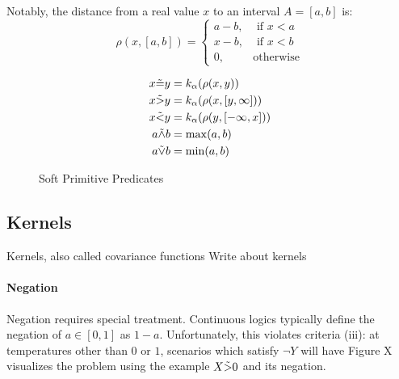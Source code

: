 Notably, the distance from a real value $x$ to an interval $A = [a, b]$ is:
\begin{equation}
\rho(x, [a, b]) =
\begin{cases}
  a - b, & \text{ if } x < a\\
  x - b, & \text{ if } x < b\\
  0,              & \text{otherwise}
\end{cases}
\end{equation}



\begin{figure}
  \begin{align*}
x \tilde{=} y &= k_\alpha(\rho(x, y))\\
x \tilde{>} y &= k_\alpha(\rho(x, [y, \infty]))\\
x \tilde{<} y &= k_\alpha(\rho(y, [-\infty, x]))\\
a \tilde{\land} b &= \max(a, b)\\
a \tilde{\lor} b &= \min(a, b)
  \end{align*}
\caption{Soft Primitive Predicates}
\end{figure}

\subsection{Kernels}
Kernels, also called covariance functions Write about kernels

\paragraph{Negation}
Negation requires special treatment.
Continuous logics typically define the negation of $a \in [0, 1]$ as $1 - a$.
Unfortunately, this violates criteria (iii): at temperatures other than $0$ or $1$, scenarios which satisfy $\neg Y$ will have 
Figure X visualizes the problem using the example $X \tilde{>} 0$ and its negation.

